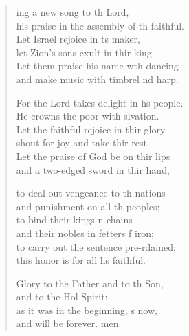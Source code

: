 \begin{verse}
  \begin{patverse}
    ing a new song to th Lord,\Med\\
his praise in the assembly of th faithful.\\
Let Israel rejoice in \pointup{\i}ts maker,\Med\\
let Zion’s sons exult in thir king.\\
Let them praise his name w\pointup{\i}th dancing\Med\\
and make music with timbrel nd harp.

For the Lord takes delight in h\pointup{\i}s people.\Med\\
He crowns the poor with slvation.\\
Let the faithful rejoice in thir glory,\Med\\
shout for joy and take thir rest.\\
Let the praise of God be on thir lips\Med\\
and a two-edged sword in thir hand,

to deal out vengeance to th nations\Med\\
and punishment on all th peoples;\\
to bind their kings \pointup{\i}n chains\Med\\
and their nobles in fetters f iron;\\
to carry out the sentence pre-rdained;\Med\\
this honor is for all h\pointup{\i}s faithful.

Glory to the Father and to th Son,\Med\\
and to the Hol Spirit:\\
as it was in the beginning, \pointup{\i}s now,\Med\\
and will be forever. men.
  \end{patverse}
\end{verse}
